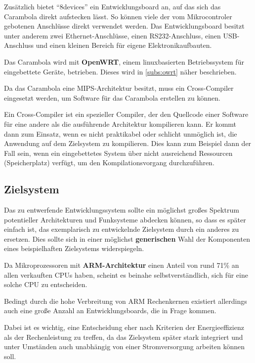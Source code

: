 Zusätzlich bietet "`8devices"' ein Entwicklungsboard an, auf das sich das
Carambola direkt aufstecken lässt. So können viele der vom Mikrocontroler
gebotenen Anschlüsse direkt verwendet werden. Das Entwicklungsboard besitzt
unter anderem zwei Ethernet-Anschlüsse, einen RS232-Anschluss, einen
USB-Anschluss und einen kleinen Bereich für eigene Elektronik\-aufbauten.

Das Carambola wird mit \textbf{OpenWRT}, einem linuxbasierten
Betriebssystem für eingebettete Geräte, betrieben. Dieses wird in
\autoref{subs:owrt} näher beschrieben.

Da das Carambola eine MIPS-Architektur besitzt, muss ein Cross-Compiler
eingesetzt werden, um Software für das Carambola erstellen zu können.
\begin{definition}
Ein Cross-Compiler ist ein spezieller Compiler, der den Quellcode einer
Software für eine andere als die ausführende Architektur kompilieren kann. Er
kommt dann zum Einsatz, wenn es nicht praktikabel oder schlicht unmöglich ist,
die Anwendung auf dem Zielsystem zu kompilieren. Dies kann zum Beispiel dann der
Fall sein, wenn ein eingebettetes System über nicht ausreichend Ressourcen
(Speicherplatz) verfügt, um den Kompilationsvorgang durchzuführen.
\end{definition}

\subsection{Zielsystem}
Das zu entwerfende Entwicklungssystem sollte ein möglichst
großes Spektrum potentieller Architekturen und Funksysteme abdecken können, so
dass es später einfach ist, das exemplarisch zu entwickelnde Zielsystem durch
ein anderes zu ersetzen. Dies sollte sich in einer möglichst
\textbf{generischen} Wahl der Komponenten eines beispielhaften Zielsystems
widerspiegeln.

Da Mikroprozessoren mit \textbf{ARM-Architektur} einen Anteil von rund
71\%\cite{IDC01} an allen verkauften CPUs haben, scheint es beinahe
selbstverständlich, sich für eine solche CPU zu entscheiden.

Bedingt durch die hohe Verbreitung von ARM Rechenkernen existiert allerdings
auch eine große Anzahl an Entwicklungsboards, die in Frage kommen.

Dabei ist es wichtig, eine Entscheidung eher nach Kriterien der Energieeffizienz
als der Rechenleistung zu treffen, da das Zielsystem später stark integriert
und unter Umständen auch unabhängig von einer Stromversorgung arbeiten können
soll.

